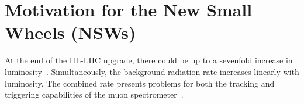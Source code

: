 



\section{Motivation for the New Small Wheels (NSWs)}

At the end of the HL-LHC upgrade, there could be up to a sevenfold increase in luminosity~\cite{hl_lhc_tdr}. Simultaneously, the background radiation rate increases linearly with luminosity. The combined rate presents problems for both the tracking and triggering capabilities of the muon spectrometer~\cite{nsw_tdr}.

